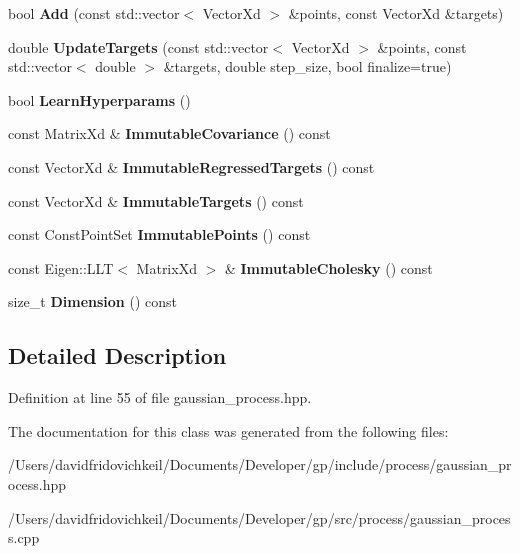 \begin{DoxyCompactItemize}
bool {\bfseries Add} (const std\+::vector$<$ Vector\+Xd $>$ \&points, const Vector\+Xd \&targets)
\item 
\hypertarget{classgp_1_1_gaussian_process_a83cc63842baab58995363b12e08cdd8a}{}\label{classgp_1_1_gaussian_process_a83cc63842baab58995363b12e08cdd8a} 
double {\bfseries Update\+Targets} (const std\+::vector$<$ Vector\+Xd $>$ \&points, const std\+::vector$<$ double $>$ \&targets, double step\+\_\+size, bool finalize=true)
\item 
\hypertarget{classgp_1_1_gaussian_process_a8ad3e9ac5a536ed71be83fac8ca4f0af}{}\label{classgp_1_1_gaussian_process_a8ad3e9ac5a536ed71be83fac8ca4f0af} 
bool {\bfseries Learn\+Hyperparams} ()
\item 
\hypertarget{classgp_1_1_gaussian_process_a4f55d908c1033b8d02f986321abc4257}{}\label{classgp_1_1_gaussian_process_a4f55d908c1033b8d02f986321abc4257} 
const Matrix\+Xd \& {\bfseries Immutable\+Covariance} () const
\item 
\hypertarget{classgp_1_1_gaussian_process_ac80689ba379920754defa7e585cf20bf}{}\label{classgp_1_1_gaussian_process_ac80689ba379920754defa7e585cf20bf} 
const Vector\+Xd \& {\bfseries Immutable\+Regressed\+Targets} () const
\item 
\hypertarget{classgp_1_1_gaussian_process_a6661f9b790c68623d9b33f55c36d3a57}{}\label{classgp_1_1_gaussian_process_a6661f9b790c68623d9b33f55c36d3a57} 
const Vector\+Xd \& {\bfseries Immutable\+Targets} () const
\item 
\hypertarget{classgp_1_1_gaussian_process_a012f521ef15c82cdcf07dc6d732e2322}{}\label{classgp_1_1_gaussian_process_a012f521ef15c82cdcf07dc6d732e2322} 
const Const\+Point\+Set {\bfseries Immutable\+Points} () const
\item 
\hypertarget{classgp_1_1_gaussian_process_a281b5c08bb7a012203a49d992098e0c3}{}\label{classgp_1_1_gaussian_process_a281b5c08bb7a012203a49d992098e0c3} 
const Eigen\+::\+L\+LT$<$ Matrix\+Xd $>$ \& {\bfseries Immutable\+Cholesky} () const
\item 
\hypertarget{classgp_1_1_gaussian_process_ac1c7728df9a864da192ad77656f5567e}{}\label{classgp_1_1_gaussian_process_ac1c7728df9a864da192ad77656f5567e} 
size\+\_\+t {\bfseries Dimension} () const
\end{DoxyCompactItemize}


\subsection{Detailed Description}


Definition at line 55 of file gaussian\+\_\+process.\+hpp.



The documentation for this class was generated from the following files\+:\begin{DoxyCompactItemize}
\item 
/\+Users/davidfridovichkeil/\+Documents/\+Developer/gp/include/process/gaussian\+\_\+process.\+hpp\item 
/\+Users/davidfridovichkeil/\+Documents/\+Developer/gp/src/process/gaussian\+\_\+process.\+cpp\end{DoxyCompactItemize}
